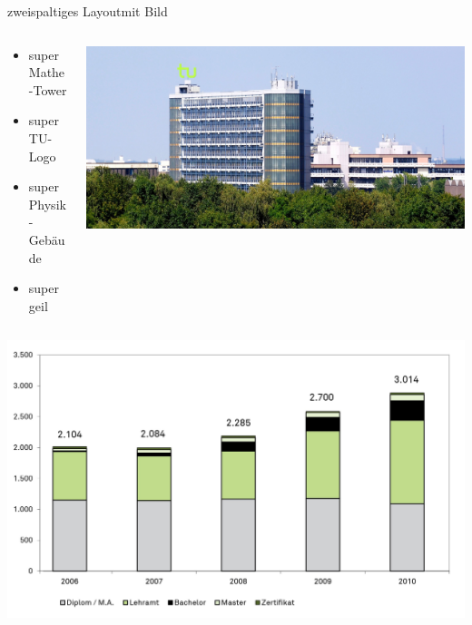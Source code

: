 \documentclass[t]{beamer}
\begin{document}
\begin{frame}{zweispaltiges Layout}{mit Bild}
    \begin{columns}[T] %
        \begin{column}{0.49\textwidth}
            \begin{itemize}
                \item super Mathe-Tower
                \item super TU-Logo
                \item super Physik-Gebäude
                \item super geil
            \end{itemize}
        \end{column}
        \begin{column}{0.49\textwidth}
            \includegraphics[width=\textwidth]{./Title-Pic.jpg}\\
        \end{column}
    \end{columns}
    \vspace{5pt}%
    \begin{columns}[T] %
        \begin{column}{0.49\textwidth}
            \hfill\includegraphics[width=\textwidth]{./image23.jpg}

\end{column}
\end{columns}
\end{frame}
\end{document}
